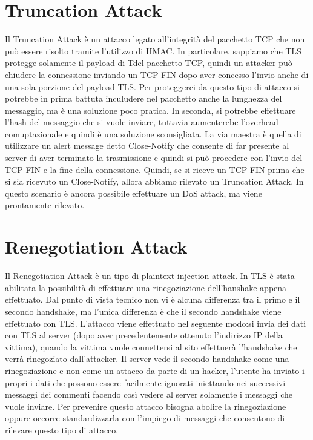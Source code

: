 \documentclass{article}
\begin{document}
\section{Truncation Attack}
Il Truncation Attack è un attacco legato all'integrità del pacchetto TCP che non può essere risolto tramite l'utilizzo di HMAC\@. In particolare, sappiamo che TLS protegge solamente il payload di Tdel pacchetto TCP, quindi un attacker può chiudere la connessione inviando un TCP FIN dopo aver concesso l'invio anche di una sola porzione del payload TLS\@.\newline
Per proteggerci da questo tipo di attacco si potrebbe in prima battuta inculudere nel pacchetto anche la lunghezza del messaggio, ma è una soluzione poco pratica\@. In seconda, si potrebbe effettuare l'hash del messaggio che si vuole inviare, tuttavia aumenterebe l'overhead comuptazionale e quindi è una soluzione sconsigliata\@. La via maestra è quella di utilizzare un alert message detto Close-Notify che consente di far presente al server di aver terminato la trasmissione e quindi si può procedere con l'invio del TCP FIN e la fine della connessione\@. Quindi, se si riceve un TCP FIN prima che si sia ricevuto un Close-Notify, allora abbiamo rilevato un Truncation Attack\@. In questo scenario è ancora possibile effettuare un DoS attack, ma viene prontamente rilevato\@.
\section{Renegotiation Attack}
Il Renegotiation Attack è un tipo di plaintext injection attack\@. In TLS è stata abilitata la possibilità di effettuare una rinegoziazione dell'hanshake appena effettuato\@. Dal punto di vista tecnico non vi è alcuna differenza tra il primo e il secondo handshake, ma l'unica differenza è che il secondo handshake viene effettuato con TLS\@.\newline
L'attacco viene effettuato nel seguente modo:\@inizialmente si invia dei dati con TLS al server (dopo aver precedentemente ottenuto l'indirizzo IP della vittima), quando la vittima vuole connettersi al sito effettuerà l'handshake che verrà rinegoziato dall'attacker\@. Il server vede il secondo handshake come una rinegoziazione e non come un attacco da parte di un hacker, l'utente ha inviato i propri i dati che possono essere facilmente ignorati iniettando nei successivi messaggi dei commenti facendo così vedere al server solamente i messaggi che vuole inviare\@.\newline
Per prevenire questo attacco bisogna abolire la rinegoziazione oppure occorre standardizzarla con l'impiego di messaggi che consentono di rilevare questo tipo di attacco\@.
\end{document}
